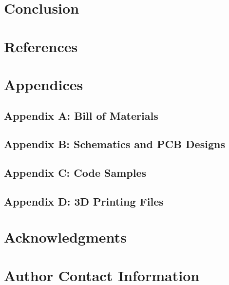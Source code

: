 \documentclass{article}
\begin{document}
\begin{multicols}{2}
		\section{Conclusion}
		\lipsum[59-61]
		
		\section{References}
		\lipsum[62-64]
		
		\section{Appendices}
		\lipsum[65-67]
		
		\subsection{Appendix A: Bill of Materials}
		\lipsum[68-70]
		
		\subsection{Appendix B: Schematics and PCB Designs}
		\lipsum[71-73]
		
		\subsection{Appendix C: Code Samples}
		\lipsum[74-76]
		
		\subsection{Appendix D: 3D Printing Files}
		\lipsum[77-79]
		
		\section{Acknowledgments}
		\lipsum[80-82]
		
		\section{Author Contact Information}
		\lipsum[83-85]
		
	\end{multicols} %
	
\end{document}
